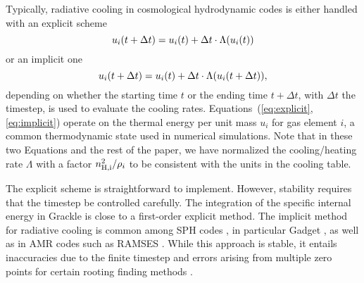 \documentclass[a4paper,fleqn,usenatbib,useAMS, twocolumn]{mnras}
\begin{document}
Typically, radiative cooling in cosmological hydrodynamic codes is
either handled with an explicit scheme
\begin{equation}
\\
u_i(t+\Delta t) = u_{i}(t) + \Delta t \cdot \Lambda(u_i(t))
\label{eq:explicit}
\end{equation}
or an implicit one
\begin{equation}
\\
u_i(t+\Delta t) = u_{i}(t) + \Delta t \cdot \Lambda(u_i(t+\Delta t)), 
\label{eq:implicit}
\end{equation}
depending on whether the starting time $t$ or the ending time $t+\Delta t$, 
with $\Delta t$ the timestep,
is used to evaluate the cooling rates. Equations~(\ref{eq:explicit}, \ref{eq:implicit})
operate on the thermal energy per unit mass $u_i$ for gas element $i$, a common thermodynamic
state used in numerical simulations.
Note that in these two Equations and the rest of the paper, we
have normalized the cooling/heating rate $\Lambda$ with a factor ${n_{\rm{H}, i}^2 / \rho_{i}}$ 
to be consistent with the units in the cooling table. 

The explicit scheme is straightforward to implement. However,
stability requires that the timestep be controlled carefully.  The
integration of the specific internal energy in {\sc Grackle} \citep{Smith2016}
is close to a first-order explicit method. The implicit method for
radiative cooling is common among SPH codes \citep{Hernquist1989}, in
particular {\sc Gadget }\citep{Springel2001}, as well as 
in AMR codes such as {\sc RAMSES}
\citep{RAMSES}. While this approach is stable, it entails inaccuracies
due to the finite timestep and errors arising from multiple zero
points for certain rooting finding methods \citep{Townsend2009}.
\end{document}

